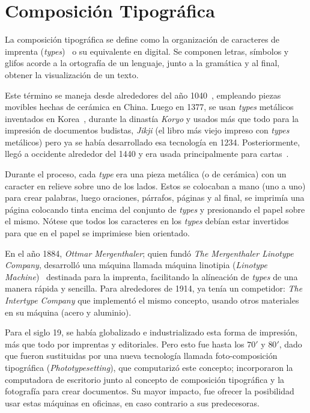 \documentclass[12pt,letterpaper,titlepage,oneside,openright]{book}
\begin{document}
\section{Composición Tipográfica}

La composición tipográfica se define como la organización de caracteres de imprenta
(\textit{types})~\cite{eckersley2008glossary} o su equivalente en digital. Se
componen letras, símbolos y glifos acorde a la ortografía de un lenguaje, junto a la
gramática y al final, obtener la visualización de un texto.

Este término se maneja desde alrededores del año 1040~\cite{needham1995shorter}, empleando piezas movibles hechas de cerámica en China. Luego en 1377, se usan \textit{types} metálicos inventados en Korea~\cite{sohn1959early}, durante la dinastía \textit{Koryo} y usados más que todo para la impresión de documentos budistas, \textit{Jikji} (el libro más viejo impreso con \textit{types} metálicos) pero ya se había desarrollado esa tecnología en 1234. Posteriormente, llegó a occidente alrededor del 1440 y era usada principalmente para cartas~\cite{eisenstein2005printing}.

Durante el proceso, cada \textit{type} era una pieza metálica (o de cerámica) con un caracter en relieve sobre uno de los lados. Estos se colocaban a mano (uno a uno) para crear palabras, luego oraciones, párrafos, páginas y al final, se imprimía una página colocando tinta encima del conjunto de \textit{types} y presionando el papel sobre el mismo. Nótese que todos los caracteres en los \textit{types} debían estar invertidos para que en el papel se imprimiese bien orientado.

En el año 1884, \textit{Ottmar Mergenthaler}; quien fundó \textit{The Mergenthaler Linotype Company}, desarrolló una máquina llamada máquina linotipia (\textit{Linotype Machine})~\cite{weblinotype} destinada para la imprenta, facilitando la alíneación de \textit{types} de una manera rápida y sencilla. Para alrededores de 1914, ya tenía un competidor: \textit{The Intertype Company} que implementó el mismo concepto, usando otros materiales en su máquina (acero y aluminio).

Para el siglo 19, se había globalizado e industrializado esta forma de impresión, más que todo por imprentas y editoriales. Pero esto fue hasta los $70'$ y $80'$, dado que fueron sustituidas por una nueva tecnología llamada foto-composición tipográfica (\textit{Phototypesetting}), que computarizó este concepto; incorporaron la computadora de escritorio junto al concepto de composición tipográfica y la fotografía para crear documentos. Su mayor impacto, fue ofrecer la posibilidad usar estas máquinas en oficinas, en caso contrario a sus predecesoras.
\end{document}
